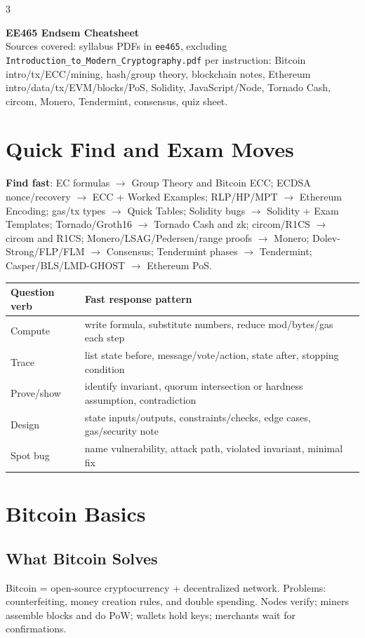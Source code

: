 \documentclass[8pt]{extarticle}
\newcommand{\term}[1]{\textbf{#1}}
\newcommand{\tightbox}[1]{\colorbox{boxc}{\parbox{0.985\linewidth}{#1}}}
\begin{document}
\scriptsize
\begin{multicols*}{3}

\begin{center}
{\Large\bfseries EE465 Endsem Cheatsheet}\\[-1pt]
{\footnotesize Sources covered: syllabus PDFs in \texttt{ee465}, excluding \texttt{Introduction\_to\_Modern\_Cryptography.pdf} per instruction: Bitcoin intro/tx/ECC/mining, hash/group theory, blockchain notes, Ethereum intro/data/tx/EVM/blocks/PoS, Solidity, JavaScript/Node, Tornado Cash, circom, Monero, Tendermint, consensus, quiz sheet.}
\end{center}

\section{Quick Find and Exam Moves}
\tightbox{\term{Find fast}: EC formulas $\to$ Group Theory and Bitcoin ECC; ECDSA nonce/recovery $\to$ ECC + Worked Examples; RLP/HP/MPT $\to$ Ethereum Encoding; gas/tx types $\to$ Quick Tables; Solidity bugs $\to$ Solidity + Exam Templates; Tornado/Groth16 $\to$ Tornado Cash and zk; circom/R1CS $\to$ circom and R1CS; Monero/LSAG/Pedersen/range proofs $\to$ Monero; Dolev-Strong/FLP/FLM $\to$ Consensus; Tendermint phases $\to$ Tendermint; Casper/BLS/LMD-GHOST $\to$ Ethereum PoS.}

\begin{tabularx}{\linewidth}{@{}lX@{}}
\toprule
Question verb & Fast response pattern\\
\midrule
Compute & write formula, substitute numbers, reduce mod/bytes/gas each step\\
Trace & list state before, message/vote/action, state after, stopping condition\\
Prove/show & identify invariant, quorum intersection or hardness assumption, contradiction\\
Design & state inputs/outputs, constraints/checks, edge cases, gas/security note\\
Spot bug & name vulnerability, attack path, violated invariant, minimal fix\\
\bottomrule
\end{tabularx}

\section{Bitcoin Basics}
\subsection{What Bitcoin Solves}
Bitcoin = open-source cryptocurrency + decentralized network. Problems: counterfeiting, money creation rules, and double spending. Nodes verify; miners assemble blocks and do PoW; wallets hold keys; merchants wait for confirmations.


\end{multicols*}
\end{document}
